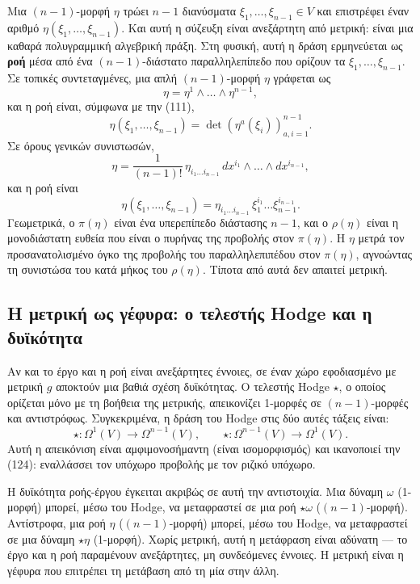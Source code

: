 \documentclass[12pt]{article}
\begin{document}
Μια $(n-1)$-μορφή $\eta$ τρώει $n-1$ διανύσματα $\xi_1, \dots, \xi_{n-1} \in V$ και επιστρέφει έναν αριθμό $\eta(\xi_1, \dots, \xi_{n-1})$. Και αυτή η σύζευξη είναι ανεξάρτητη από μετρική: είναι μια καθαρά πολυγραμμική αλγεβρική πράξη. Στη φυσική, αυτή η δράση ερμηνεύεται ως \textbf{ροή} μέσα από ένα $(n-1)$-διάστατο παραλληλεπίπεδο που ορίζουν τα $\xi_1, \dots, \xi_{n-1}$. Σε τοπικές συντεταγμένες, μια απλή $(n-1)$-μορφή $\eta$ γράφεται ως
\[
\eta = \eta^1 \wedge \dots \wedge \eta^{n-1},
\]
και η ροή είναι, σύμφωνα με την (111),
\[
\eta(\xi_1, \dots, \xi_{n-1}) = \det \left( \eta^a(\xi_i) \right)_{a,i=1}^{n-1}.
\]
Σε όρους γενικών συνιστωσών,
\[
\eta = \frac{1}{(n-1)!} \, \eta_{i_1 \dots i_{n-1}} \, dx^{i_1} \wedge \dots \wedge dx^{i_{n-1}},
\]
και η ροή είναι
\[
\eta(\xi_1, \dots, \xi_{n-1}) = \eta_{i_1 \dots i_{n-1}} \, \xi^{i_1}_1 \dots \xi^{i_{n-1}}_{n-1}.
\]
Γεωμετρικά, ο $\pi(\eta)$ είναι ένα υπερεπίπεδο διάστασης $n-1$, και ο $\rho(\eta)$ είναι η μονοδιάστατη ευθεία που είναι ο πυρήνας της προβολής στον $\pi(\eta)$. Η $\eta$ μετρά τον προσανατολισμένο όγκο της προβολής του παραλληλεπιπέδου στον $\pi(\eta)$, αγνοώντας τη συνιστώσα του κατά μήκος του $\rho(\eta)$. Τίποτα από αυτά δεν απαιτεί μετρική.

\subsection{Η μετρική ως γέφυρα: ο τελεστής Hodge και η δυϊκότητα}

Αν και το έργο και η ροή είναι ανεξάρτητες έννοιες, σε έναν χώρο εφοδιασμένο με μετρική $g$ αποκτούν μια βαθιά σχέση δυϊκότητας. Ο τελεστής Hodge $\star$, ο οποίος ορίζεται μόνο με τη βοήθεια της μετρικής, απεικονίζει 1-μορφές σε $(n-1)$-μορφές και αντιστρόφως. Συγκεκριμένα, η δράση του Hodge στις δύο αυτές τάξεις είναι:
\[
\star: \Omega^1(V) \to \Omega^{n-1}(V), \qquad \star: \Omega^{n-1}(V) \to \Omega^1(V).
\]
Αυτή η απεικόνιση είναι αμφιμονοσήμαντη (είναι ισομορφισμός) και ικανοποιεί την (124): εναλλάσσει τον υπόχωρο προβολής με τον ριζικό υπόχωρο.

Η δυϊκότητα ροής-έργου έγκειται ακριβώς σε αυτή την αντιστοιχία. Μια δύναμη $\omega$ (1-μορφή) μπορεί, μέσω του Hodge, να μεταφραστεί σε μια ροή $\star \omega$ ($(n-1)$-μορφή). Αντίστροφα, μια ροή $\eta$ ($(n-1)$-μορφή) μπορεί, μέσω του Hodge, να μεταφραστεί σε μια δύναμη $\star \eta$ (1-μορφή). Χωρίς μετρική, αυτή η μετάφραση είναι αδύνατη — το έργο και η ροή παραμένουν ανεξάρτητες, μη συνδεόμενες έννοιες. Η μετρική είναι η γέφυρα που επιτρέπει τη μετάβαση από τη μία στην άλλη.
\end{document}
